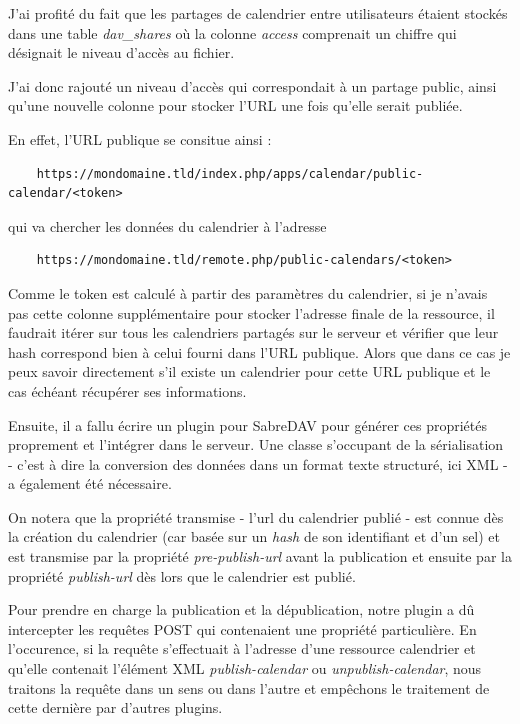 \documentclass[10pt,a4paper]{report}
\begin{document}
	J'ai profité du fait que les partages de calendrier entre utilisateurs étaient stockés dans une table \textit{dav\_shares} où la colonne \textit{access} comprenait un chiffre qui désignait le niveau d'accès au fichier.
	
	J'ai donc rajouté un niveau d'accès qui correspondait à un partage public, ainsi qu'une nouvelle colonne pour stocker l'URL une fois qu'elle serait publiée. 
	
	En effet, l'URL publique se consitue ainsi : 
	\begin{verbatim}
	https://mondomaine.tld/index.php/apps/calendar/public-calendar/<token>
	\end{verbatim}
	qui va chercher les données du calendrier à l'adresse
	\begin{verbatim}
	https://mondomaine.tld/remote.php/public-calendars/<token>
	\end{verbatim}
	
	Comme le token est calculé à partir des paramètres du calendrier, si je n'avais pas cette colonne supplémentaire pour stocker l'adresse finale de la ressource, il faudrait itérer sur tous les calendriers partagés sur le serveur et vérifier que leur hash correspond bien à celui fourni dans l'URL publique. Alors que dans ce cas je peux savoir directement s'il existe un calendrier pour cette URL publique et le cas échéant récupérer ses informations.
	
	Ensuite, il a fallu écrire un plugin pour SabreDAV pour générer ces propriétés proprement et l'intégrer dans le serveur. Une classe s'occupant de la sérialisation - c'est à dire la conversion des données dans un format texte structuré, ici XML - a également été nécessaire.
	
	On notera que la propriété transmise - l'url du calendrier publié - est connue dès la création du calendrier (car basée sur un \textit{hash} de son identifiant et d'un sel) et est transmise par la propriété \textit{pre-publish-url} avant la publication et ensuite par la propriété \textit{publish-url} dès lors que le calendrier est publié.
	
	Pour prendre en charge la publication et la dépublication, notre plugin a dû intercepter les requêtes POST qui contenaient une propriété particulière.
	En l'occurence, si la requête s'effectuait à l'adresse d'une ressource calendrier et qu'elle contenait l'élément XML \textit{publish-calendar} ou \textit{unpublish-calendar}, nous traitons la requête dans un sens ou dans l'autre et empêchons le traitement de cette dernière par d'autres plugins.
	
\end{document}
